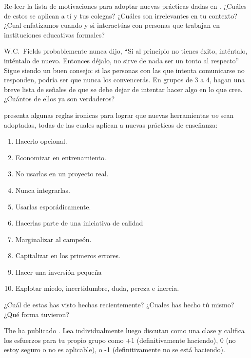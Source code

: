 Re-leer la lista de motivaciones para adoptar nuevas prácticas
dadas en .
¿Cuáles de estos se aplican a tí y tus colegas?
¿Cuáles son irrelevantes en tu contexto?
¿Cual enfatizamos
cuando y si interactúas con personas que trabajan en instituciones educativas formales?



W.C.~Fields probablemente nunca dijo,
``Si al principio no tienes éxito, inténtalo, inténtalo de nuevo.
Entonces déjalo, no sirve de nada ser un tonto al respecto''
Sigue siendo un buen consejo:
si las personas con las que intenta comunicarse no responden,
podría ser que nunca los convencerás.
En grupos de 3 a 4,
hagan una breve lista de señales de que se debe dejar de intentar hacer algo en lo que cree.
¿Cuántos de ellos ya son verdaderos?


\cite{Farm2006} presenta algunas reglas ironicas para lograr que nuevas herramientas \emph{no} sean adoptadas,
todas de las cuales aplican a nuevas prácticas de enseñanza:

\begin{enumerate}

\item
  Hacerlo opcional.

\item
Economizar en entrenamiento. 

\item
  No usarlas en un proyecto real.

\item
  Nunca integrarlas.

\item
Usarlas esporádicamente.

\item
  Hacerlas parte de una iniciativa de calidad

\item
  Marginalizar al campeón.

\item
Capitalizar en los primeros errores.

\item
Hacer una inversión pequeña

\item
 Explotar miedo, incertidumbre, duda, pereza e inercia.


\end{enumerate}

¿Cuál de estas has visto  hechas recientemente?
¿Cuales has hecho tú mismo?
¿Qué forma tuvieron?




The 
ha publicado .
Lea individualmente
luego discutan como una clase
y califica los esfuerzos para tu propio grupo como +1 (definitivamente haciendo),
0 (no estoy seguro o no es aplicable),
o -1 (definitivamente no se está haciendo).



